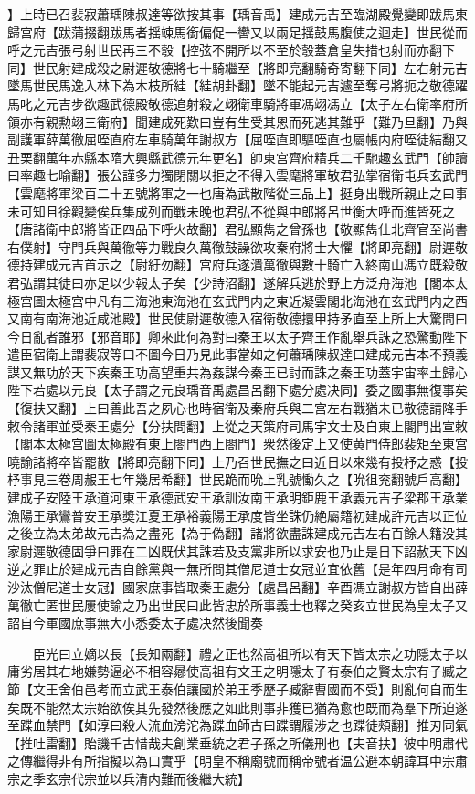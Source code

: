 】上時已召裴寂蕭瑀陳叔達等欲按其事【瑀音禹】建成元吉至臨湖殿覺變即跋馬東歸宫府【跋蒲掇翻跋馬者揺竦馬銜偏促一轡又以兩足揺鼓馬腹使之迴走】世民從而呼之元吉張弓射世民再三不彀【控弦不開所以不至於彀蓋倉皇失措也射而亦翻下同】世民射建成殺之尉遲敬德將七十騎繼至【將即亮翻騎奇寄翻下同】左右射元吉墜馬世民馬逸入林下為木枝所絓【絓胡卦翻】墜不能起元吉遽至奪弓將扼之敬德躍馬叱之元吉步欲趣武德殿敬德追射殺之翊衛車騎將軍馮翊馮立【太子左右衛率府所領亦有親勲翊三衛府】聞建成死歎曰豈有生受其恩而死逃其難乎【難乃旦翻】乃與副護軍薛萬徹屈咥直府左車騎萬年謝叔方【屈咥直即驅咥直也屬帳内府咥徒結翻又丑栗翻萬年赤縣本隋大興縣武德元年更名】帥東宫齊府精兵二千馳趣玄武門【帥讀曰率趣七喻翻】張公謹多力獨閉關以拒之不得入雲麾將軍敬君弘掌宿衛屯兵玄武門【雲麾將軍梁百二十五號將軍之一也唐為武散階從三品上】挺身出戰所親止之曰事未可知且徐觀變俟兵集成列而戰未晚也君弘不從與中郎將呂世衡大呼而進皆死之【唐諸衛中郎將皆正四品下呼火故翻】君弘顯雋之曾孫也【敬顯雋仕北齊官至尚書右僕射】守門兵與萬徹等力戰良久萬徹鼓譟欲攻秦府將士大懼【將即亮翻】尉遲敬德持建成元吉首示之【尉紆勿翻】宫府兵遂潰萬徹與數十騎亡入終南山馮立既殺敬君弘謂其徒曰亦足以少報太子矣【少詩沼翻】遂解兵逃於野上方泛舟海池【閣本太極宫圖太極宫中凡有三海池東海池在玄武門内之東近凝雲閣北海池在玄武門内之西又南有南海池近咸池殿】世民使尉遲敬德入宿衛敬德擐甲持矛直至上所上大驚問曰今日亂者誰邪【邪音耶】卿來此何為對曰秦王以太子齊王作亂舉兵誅之恐驚動陛下遣臣宿衛上謂裴寂等曰不圖今日乃見此事當如之何蕭瑀陳叔達曰建成元吉本不預義謀又無功於天下疾秦王功高望重共為姦謀今秦王已討而誅之秦王功蓋宇宙率土歸心陛下若處以元良【太子謂之元良瑀音禹處昌呂翻下處分處决同】委之國事無復事矣【復扶又翻】上曰善此吾之夙心也時宿衛及秦府兵與二宫左右戰猶未已敬德請降手敕令諸軍並受秦王處分【分扶問翻】上從之天策府司馬宇文士及自東上閤門出宣敕【閣本太極宫圖太極殿有東上閤門西上閤門】衆然後定上又使黄門侍郎裴矩至東宫曉諭諸將卒皆罷散【將即亮翻下同】上乃召世民撫之曰近日以來幾有投杼之惑【投杼事見三卷周赧王七年幾居希翻】世民跪而吮上乳號慟久之【吮徂兖翻號戶高翻】建成子安陸王承道河東王承德武安王承訓汝南王承明鉅鹿王承義元吉子梁郡王承業漁陽王承鸞普安王承奬江夏王承裕義陽王承度皆坐誅仍絶屬籍初建成許元吉以正位之後立為太弟故元吉為之盡死【為于偽翻】諸將欲盡誅建成元吉左右百餘人籍没其家尉遲敬德固爭曰罪在二凶既伏其誅若及支黨非所以求安也乃止是日下詔赦天下凶逆之罪止於建成元吉自餘黨與一無所問其僧尼道士女冠並宜依舊【是年四月命有司沙汰僧尼道士女冠】國家庶事皆取秦王處分【處昌呂翻】辛酉馮立謝叔方皆自出薛萬徹亡匿世民屢使諭之乃出世民曰此皆忠於所事義士也釋之癸亥立世民為皇太子又詔自今軍國庶事無大小悉委太子處决然後聞奏

　　臣光曰立嫡以長【長知兩翻】禮之正也然高祖所以有天下皆太宗之功隱太子以庸劣居其右地嫌勢逼必不相容曏使高祖有文王之明隱太子有泰伯之賢太宗有子臧之節【文王舍伯邑考而立武王泰伯讓國於弟王季歷子臧辭曹國而不受】則亂何自而生矣既不能然太宗始欲俟其先發然後應之如此則事非獲已猶為愈也既而為羣下所迫遂至蹀血禁門【如淳曰殺人流血滂沱為蹀血師古曰蹀謂履涉之也蹀徒頰翻】推刃同氣【推吐雷翻】貽譏千古惜哉夫創業垂統之君子孫之所儀刑也【夫音扶】彼中明肅代之傳繼得非有所指擬以為口實乎【明皇不稱廟號而稱帝號者温公避本朝諱耳中宗肅宗之季玄宗代宗並以兵清内難而後繼大統】

